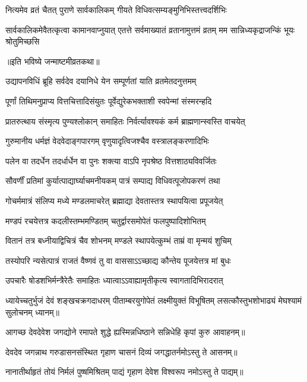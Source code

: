 \twolineshloka
{नित्यमेव व्रतं चैतत् पुराणे सार्वकालिकम्}
{गीयते विधिवत्सम्यङ्मुनिभिस्तत्त्वदर्शिभिः}%

\threelineshloka
{सार्वकालिकमेवैतत्कृत्वा कामानवाप्नुयात्}
{एतत्ते सर्वमाख्यातं व्रतानामुत्तमं व्रतम्}
{मम सान्निध्यकृद्राजन्किं भूयः श्रोतुमिच्छसि}%

\centerline{॥इति भविष्ये जन्माष्टमीव्रतकथा॥}



\twolineshloka
{उद्यापनविधिं ब्रूहि सर्वदेव दयानिधे}
{येन सम्पूर्णतां याति व्रतमेतदनुत्तमम्}

\twolineshloka
{पूर्णां तिथिमनुप्राप्य वित्तचित्तादिसंयुतः}
{पूर्वेद्युरेकभक्ताशी स्वपेन्मां संस्मरन्हदि}

\twolineshloka
{प्रातरुत्थाय संस्मृत्य पुण्यश्लोकान् समाहितः}
{निर्वर्त्यावश्यकं कर्म ब्राह्मणान्स्वस्ति वाचयेत्}

\twolineshloka
{गुरुमानीय धर्मज्ञं वेदवेदाङ्गपारगम्}
{वृणुयादृत्विजश्चैव वस्त्रालङ्करणादिभिः}

\twolineshloka
{पलेन वा तदर्धेन तदर्धार्धेन वा पुनः}
{शक्त्या वाऽपि नृपश्रेष्ठ वित्तशाठ्यविवर्जितः}

\twolineshloka
{सौवर्णीं प्रतिमां कुर्यात्पाद्यार्घ्याचमनीयकम्}
{पात्रं सम्पाद्य विधिवत्पूजोपकरणं तथा}

\twolineshloka
{गोचर्ममात्रं संलिप्य मध्ये मण्डलमाचरेत्}
{ब्रह्माद्या देवतास्तत्र स्थापयित्वा प्रपूजयेत्}

\twolineshloka
{मण्डपं रचयेत्तत्र कदलीस्तम्भमण्डितम्}
{चतुर्द्वारसमोपेतं फलपुष्पादिशोभितम्}

\twolineshloka
{वितानं तत्र बध्नीयाद्विचित्रं चैव शोभनम्}
{मण्डले स्थापयेत्कुम्भं ताम्रं वा मृन्मयं शुचिम्}

\twolineshloka
{तस्योपरि न्यसेत्पात्रं राजतं वैष्णवं तु वा}
{वाससाऽऽच्छाद्य कौन्तेय पूजयेत्तत्र मां बुधः}

\twolineshloka
{उपचारैः षोडशभिर्मन्त्रैरेतैः समाहितः}
{ध्यात्वाऽऽवाह्यामृतीकृत्य स्वागतादिभिरादरात्}

\threelineshloka
{ध्यायेच्चतुर्भुजं देवं शङ्खचक्रगदाधरम्}
{पीताम्बरयुगोपेतं लक्ष्मीयुक्तं विभूषितम्}
{लसत्कौस्तुभशोभाढ्यं मेघश्यामं सुलोचनम्}
ध्यानम्॥

\twolineshloka
{आगच्छ देवदेवेश जगद्योने रमापते}
{शुद्धे ह्यस्मिन्नधिष्ठाने सन्निधेहि कृपां कुरु}
आवाहनम्॥

\twolineshloka
{देवदेव जगन्नाथ गरुडासनसंस्थित}
{गृहाण चासनं दिव्यं जगद्धातर्नमोऽस्तु ते}
आसनम्॥

\twolineshloka
{नानातीर्थाहृतं तोयं निर्मलं पुष्षमिश्रितम्}
{पाद्यं गृहाण देवेश विश्वरूप नमोऽस्तु ते}
पाद्यम्॥

